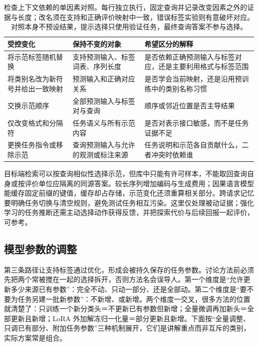 \begin{table}[tbp]
  \centering
  \small
  \begin{tabularx}{\linewidth}{p{30mm}XX}
    \toprule
    受控变化 & 保持不变的对象 & 希望区分的解释 \\
    \midrule
    将示范标签随机替换 & 支持预测输入、标签词表、序列长度 & 是否依赖正确预测输入与标签对应，还是主要利用格式与标签范围 \\
    将类别名改为新符号并给出一致映射 & 预测输入和正确对应关系 & 是否学会当前映射，还是沿用预训练中的类别名称习惯 \\
    交换示范顺序 & 全部预测输入与标签对与查询 & 顺序或邻近位置是否主导结果 \\
    仅改变格式和分隔符 & 任务语义与所有示范内容 & 是否对表示接口敏感，而不是任务证据不足 \\
    更换任务指令或移除示范 & 查询预测输入与允许的观测或标注来源 & 任务说明和示范各自贡献什么，二者冲突时依赖谁 \\
    \bottomrule
  \end{tabularx}
  \caption{检查上下文依赖的单因素对照。每行独立执行，固定查询并记录改变因素之外的证据与长度；改名须在支持和正确评价映射中一致，错误标签实验则有意破坏对应。对照本身不预设结果，提示选择只使用验证任务，最终查询答案不参与选择。}
  \label{tab:ket-transfer-context-controls}
\end{table}

目标端检索可以按查询相似性选择示范，但库中只能有许可样本，不能取回查询自身或按评价单位应隔离的同源答案。较长序列增加编码与生成费用；因果语言模型能缓存固定前缀的键值，缓存却占存储，示范变化还须重算相关部分。跨请求记忆要明确任务切换与清空规则，避免测试任务相互污染。这里仅处理被动证据；强化学习的任务推断还需主动选择动作获得反馈，并把探索代价与后续回报一起评价，可参考。

\subsection{模型参数的调整}
\label{sec:ket-transfer-parameter-adaptation}

第三条路径让支持标签通过优化，形成会被持久保存的任务参数。讨论方法前必须先把两个常被搅在一起的选择拆开，否则方法名会误导人。第一个维度是“允许更新多少来源已有参数”：完全不动、只动一部分、还是全部动。第二个维度是“要不要为任务另建一批新参数”：不新增、或新增。两个维度一交叉，很多方法的位置就清楚了：只训练一个新分类头＝不更新已有参数但新增；全量微调再加新头＝全部更新且新增；LoRA 外加解冻归一化量＝部分更新且新增。下面按“全量调整、只调已有部分、附加任务参数”三种机制展开，它们是讲解重点而非互斥的类别，实际方案常是组合。

